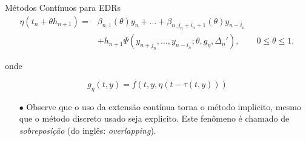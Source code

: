 \documentclass{beamer}
\theoremstyle{plain}
\theoremstyle{definition}
\begin{document}
\begin{frame}{Métodos Contínuos para EDRs}
    \begin{equation}
        \begin{split}
            \eta(t_n + \theta h_{n+1}) = &\beta_{n, 1} (\theta) y_{n} + \dots + \beta_{n, j_n + i_n + 1}(\theta) y_{n - i_n} \\
                                         &+ h_{n+1} \Psi(y_{n+j_n}, \dots, y_{n-i_n}; \theta, g_\eta, \Delta _n '), \qquad 0 \leq \theta \leq 1,
                                         \label{chap3:sec:2:def:eq:Interpolant_extension}
        \end{split}
    \end{equation}


    onde

    $$
    g_{\eta}(t, y)=f(t, y, \eta(t-\tau(t, y)))
    $$

    \begin{itemize}
        \item[$\bullet$] Observe que o uso da extensão contínua torna o método implicito, mesmo que o método discreto usado seja explicito. Este fenômeno é chamado de \textit{sobreposição} (do inglês: \textit{overlapping}).

    \end{itemize}

\end{frame}


\end{document}
